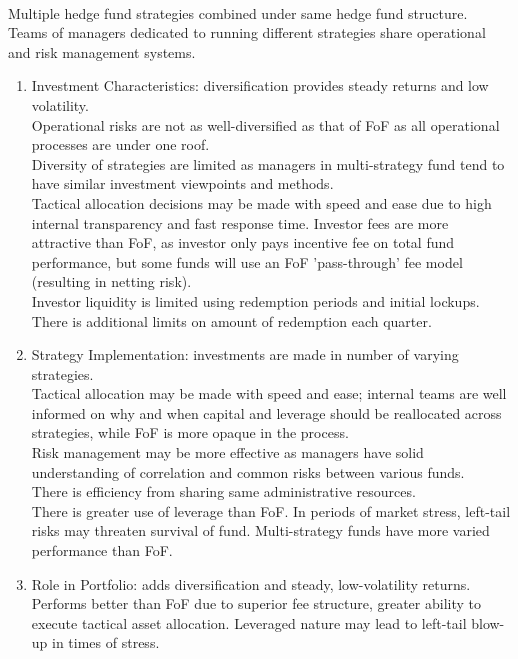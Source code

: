 \begin{remark} \\
Multiple hedge fund strategies combined under same hedge fund structure.\\
Teams of managers dedicated to running different strategies share operational and risk management systems.
\begin{enumerate}[label=\roman*.]
\setlength{\itemsep}{0pt}
\item Investment Characteristics: diversification provides steady returns and low volatility.\\
Operational risks are not as well-diversified as that of FoF as all operational processes are under one roof.\\
Diversity of strategies are limited as managers in multi-strategy fund tend to have similar investment viewpoints and methods.\\
Tactical allocation decisions may be made with speed and ease due to high internal transparency and fast response time. Investor fees are more attractive than FoF, as investor only pays incentive fee on total fund performance, but some funds will use an FoF 'pass-through' fee model (resulting in netting risk).\\
Investor liquidity is limited using redemption periods and initial lockups. There is additional limits on amount of redemption each quarter.
\item Strategy Implementation: investments are made in number of varying strategies.\\
Tactical allocation may be made with speed and ease; internal teams are well informed on why and when capital and leverage should be reallocated across strategies, while FoF is more opaque in the process.\\
Risk management may be more effective as managers have solid understanding of correlation and common risks between various funds.\\
There is efficiency from sharing same administrative resources.\\
There is greater use of leverage than FoF. In periods of market stress, left-tail risks may threaten survival of fund. Multi-strategy funds have more varied performance than FoF.
\item Role in Portfolio: adds diversification and steady, low-volatility returns. Performs better than FoF due to superior fee structure, greater ability to execute tactical asset allocation. Leveraged nature may lead to left-tail blow-up in times of stress.
\end{enumerate}
\end{remark}

